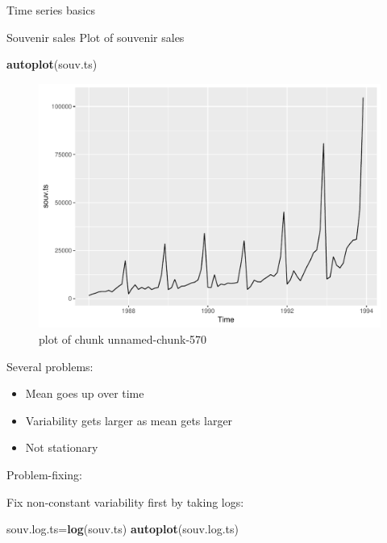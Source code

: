 \documentclass[ignorenonframetext,]{beamer}
\newenvironment{Shaded}{\begin{snugshade}}{\end{snugshade}}
\newcommand{\KeywordTok}[1]{\textcolor[rgb]{0.13,0.29,0.53}{\textbf{#1}}}
\newcommand{\NormalTok}[1]{#1}
\providecommand{\tightlist}{%
  \setlength{\itemsep}{0pt}\setlength{\parskip}{0pt}}
\begin{document}
\begin{frame}[fragile]{Time series basics}
\begin{block}{Souvenir sales}
Plot of souvenir sales

\begin{Shaded}
\begin{Highlighting}[]
\KeywordTok{autoplot}\NormalTok{(souv.ts)}
\end{Highlighting}
\end{Shaded}

\begin{figure}
\centering
\includegraphics{figure/unnamed-chunk-570-1.pdf}
\caption{plot of chunk unnamed-chunk-570}
\end{figure}

Several problems:

\begin{itemize}
\tightlist
\item
  Mean goes up over time
\item
  Variability gets larger as mean gets larger
\item
  Not stationary
\end{itemize}

Problem-fixing:

Fix non-constant variability first by taking logs:

\begin{Shaded}
\begin{Highlighting}[]
\NormalTok{souv.log.ts=}\KeywordTok{log}\NormalTok{(souv.ts)}
\KeywordTok{autoplot}\NormalTok{(souv.log.ts)}
\end{Highlighting}
\end{Shaded}


\end{block}
\end{frame}
\end{document}
